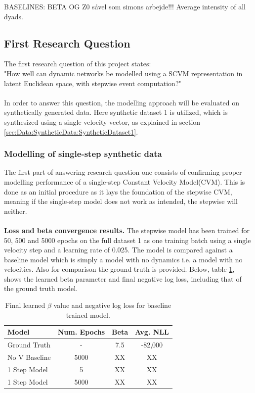 
BASELINES: BETA OG Z0 såvel som simons arbejde!!! Average intensity of all dyads. 

\subsection{First Research Question}
\label{sec:ResearchQuestion1}
The first research question of this project states:
\\
"How  well  can  dynamic  networks  be  modelled  using  a  SCVM  representation  in latent Euclidean space, with stepwise event computation?"
\\\\
In order to answer this question, the modelling approach will be evaluated on synthetically generated data.
Here synthetic dataset 1 is utilized, which is synthesized using a single velocity vector, as explained in section \ref{sec:Data:SyntheticData:SyntheticDataset1}.

\subsubsection{Modelling of single-step synthetic data}
\label{sec:ResearchQuestion1:singleStepSynthetic}
The first part of answering research question one consists of confirming proper modelling performance of a single-step Constant Velocity Model(CVM). 
This is done as an initial procedure as it lays the foundation of the stepwise CVM, meaning if the single-step model does not work as intended, the stepwise will neither.
\\\\
\textbf{Loss and beta convergence results.}
The stepwise model has been trained for 50, 500 and 5000 epochs on the full dataset 1 as one training batch using a single velocity step and a learning rate of 0.025. The model is compared against a baseline model which is simply a model with no dynamics i.e. a model with no velocities. Also for comparison the ground truth is provided.
Below, table \ref{tab:SingleStep1}, shows the learned beta parameter and final negative log loss, including that of the ground truth model.

\begin{table}[H]
\centering
\begin{tabular}{|l|c|cc|}
\hline
Model         & \multicolumn{1}{l|}{Num. Epochs} & Beta & Avg. NLL \\ \hline
Ground Truth  & -                                & 7.5  & -82,000  \\
No V Baseline & 5000                             & XX   & XX       \\
1 Step Model  & 5                                & XX   & XX       \\
1 Step Model  & 5000                             & XX   & XX       \\ \hline
\end{tabular}
\caption{Final learned $\beta$ value and negative log loss for baseline trained model.}
\label{tab:SingleStep1}
\end{table}


